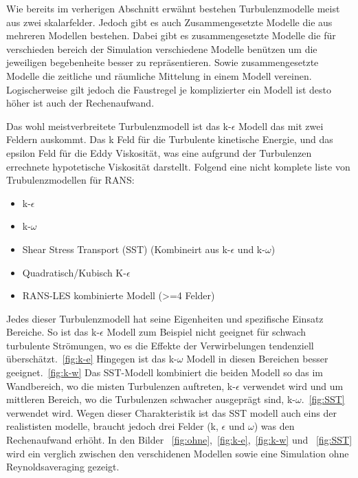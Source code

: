 \begin{refsection}
Wie bereits im verherigen Abschnitt erwähnt bestehen Turbulenzmodelle meist aus zwei skalarfelder.
Jedoch gibt es auch Zusammengesetzte Modelle die aus mehreren Modellen bestehen.
Dabei gibt es zusammengesetzte Modelle die für verschieden bereich der Simulation verschiedene Modelle benützen um die jeweiligen begebenheite besser zu repräsentieren.
Sowie zusammengesetzte Modelle die zeitliche und räumliche Mittelung in einem Modell vereinen.
Logischerweise gilt jedoch die Faustregel je komplizierter ein Modell ist desto höher ist auch der Rechenaufwand.

Das wohl meistverbreitete Turbulenzmodell ist das k-$\epsilon$ Modell das mit zwei Feldern auskommt. Das k Feld für die Turbulente kinetische Energie,
und das epsilon Feld für die Eddy Viskosität, was eine aufgrund der Turbulenzen errechnete hypotetische Viskosität darstellt.
Folgend eine nicht komplete liste von Trubulenzmodellen für RANS:

\begin{itemize}
    \item k-$\epsilon$
    \item k-$\omega$
    \item Shear Stress Transport (SST) (Kombineirt aus k-$\epsilon$ und k-$\omega$)
    \item Quadratisch/Kubisch K-$\epsilon$
    \item RANS-LES kombinierte Modell (>=4 Felder)
\end{itemize}

Jedes dieser Turbulenzmodell hat seine Eigenheiten und spezifische Einsatz Bereiche.
So ist das k-$\epsilon$ Modell zum Beispiel nicht geeignet für schwach turbulente Strömungen,
wo es die Effekte der Verwirbelungen tendenziell überschätzt.~\ref{fig:k-e}
Hingegen ist das k-$\omega$ Modell in diesen Bereichen besser geeignet.~\ref{fig:k-w}
Das SST-Modell kombiniert die beiden Modell so das im Wandbereich,
wo die misten Turbulenzen auftreten, k-$\epsilon$ verwendet wird und um mittleren Bereich,
wo die Turbulenzen schwacher ausgeprägt sind, k-$\omega$.~\ref{fig:SST} verwendet wird.
Wegen dieser Charakteristik ist das SST modell auch eins der realististen modelle, braucht jedoch drei Felder (k, $\epsilon$ und $\omega$)
was den Rechenaufwand erhöht.
In den Bilder ~\ref{fig:ohne},~\ref{fig:k-e},~\ref{fig:k-w} und ~\ref{fig:SST}
wird ein verglich zwischen den verschidenen Modellen sowie eine Simulation ohne Reynoldsaveraging gezeigt.


\end{refsection}
